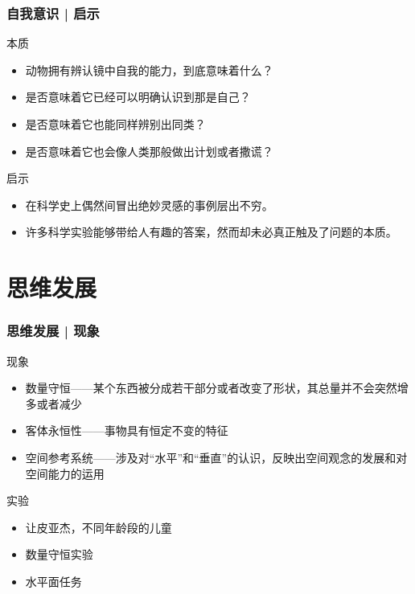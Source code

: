 \begin{frame}
  \frametitle{自我意识 | 启示}
  \begin{block}{本质}
    \begin{itemize}
      \item 动物拥有辨认镜中自我的能力，到底意味着什么？
      \item 是否意味着它已经可以明确认识到那是自己？
      \item 是否意味着它也能同样辨别出同类？
      \item 是否意味着它也会像人类那般做出计划或者撒谎？
    \end{itemize}
  \end{block}
  \pause
  \begin{block}{启示}
    \begin{itemize}
      \item 在科学史上偶然间冒出绝妙灵感的事例层出不穷。
      \item 许多科学实验能够带给人有趣的答案，然而却未必真正触及了问题的本质。
    \end{itemize}
  \end{block}
\end{frame}

\section{思维发展}
\begin{frame}
  \frametitle{思维发展 | 现象}
  \begin{block}{现象}
    \begin{itemize}
      \item 数量守恒——某个东西被分成若干部分或者改变了形状，其总量并不会突然增多或者减少
      \item 客体永恒性——事物具有恒定不变的特征
      \item 空间参考系统——涉及对“水平”和“垂直”的认识，反映出空间观念的发展和对空间能力的运用
    \end{itemize}
  \end{block}
  \pause
  \begin{block}{实验}
    \begin{itemize}
      \item 让\textbullet 皮亚杰，不同年龄段的儿童
      \item 数量守恒实验
      \item 水平面任务
    \end{itemize}
  \end{block}
\end{frame}

